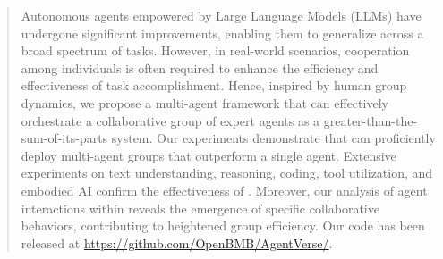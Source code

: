 \begin{abstract}

Autonomous agents empowered by Large Language Models (LLMs) have undergone significant improvements, enabling them to generalize across a broad spectrum of tasks. However, in real-world scenarios, cooperation among individuals is often required to enhance the efficiency and effectiveness of task accomplishment. Hence, inspired by human group dynamics, we propose a multi-agent framework \framework that can effectively orchestrate a collaborative group of expert agents as a greater-than-the-sum-of-its-parts system. Our experiments demonstrate that \framework can proficiently deploy multi-agent groups that outperform a single agent. Extensive experiments on text understanding, reasoning, coding, tool utilization, and embodied AI confirm the effectiveness of \framework. Moreover, our analysis of agent interactions within \framework reveals the emergence of specific collaborative behaviors, contributing to heightened group efficiency. 
Our code has been released at \url{https://github.com/OpenBMB/AgentVerse/}.


\end{abstract}